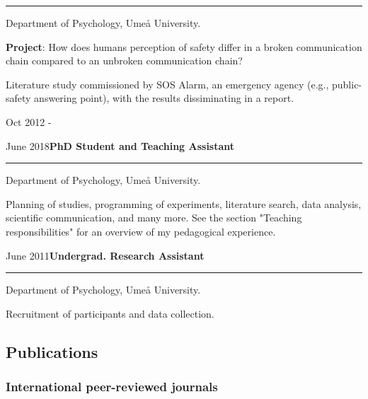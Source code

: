 \documentclass[]{article}
\begin{document}
\hrule
\begin{changemargin}{2.3cm}{2.4cm}

Department of Psychology, Umeå University.

\textbf{Project}: How does humans perception of safety differ in a broken communication chain compared to an unbroken communication chain? 

Literature study commissioned by SOS Alarm, an emergency agency (e.g., public-safety answering point), with the results dissiminating in a report.

\end{changemargin}

Oct 2012 -

June
2018\hspace{0.75cm}\textbf{PhD Student and Teaching Assistant}\vspace{1mm}

\hrule
\begin{changemargin}{2.3cm}{2.4cm}

Department of Psychology, Umeå University.

Planning of studies, programming of experiments, literature search, data analysis, scientific communication, and many more. See the section "Teaching responsibilities" for an overview of my pedagogical experience.

\end{changemargin}

June
2011\hspace{0.75cm}\textbf{Undergrad. Research Assistant}\vspace{1mm}

\hrule
\begin{changemargin}{2.3cm}{2.4cm}

Department of Psychology, Umeå University.

Recruitment of participants and data collection.

\end{changemargin}

\hypertarget{publications}{%
\subsection{Publications}\label{publications}}

\hypertarget{international-peer-reviewed-journals}{%
\subsubsection{International peer-reviewed
journals}\label{international-peer-reviewed-journals}}
\end{document}
